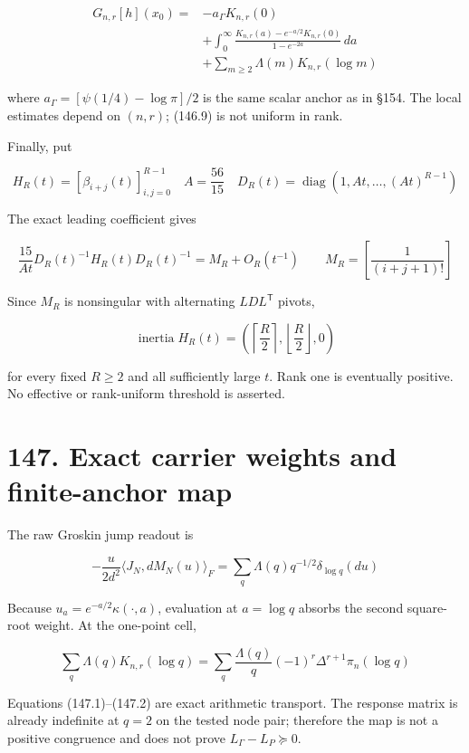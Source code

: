 \documentclass[
  11pt,
]{book}
\begin{document}
\[
\boxed{
\begin{aligned}
G_{n,r}[h](x_0)={}&-a_\Gamma K_{n,r}(0)\\
&+\int_0^\infty
\frac{K_{n,r}(a)-e^{-a/2}K_{n,r}(0)}
{1-e^{-2a}}\,da\\
&+\sum_{m\ge2}\Lambda(m)K_{n,r}(\log m)
\end{aligned}}
\tag{146.9}
\]

where \(a_\Gamma=[\psi(1/4)-\log\pi]/2\) is the same scalar anchor as in
§154. The local estimates depend on \((n,r)\); (146.9) is not uniform in
rank.

Finally, put

\[
H_R(t)=[\beta_{i+j}(t)]_{i,j=0}^{R-1}
\quad
A=\frac{56}{15}
\quad
D_R(t)=\operatorname{diag}
(1,At,\ldots,(At)^{R-1})
\]

The exact leading coefficient gives

\[
\boxed{
\frac{15}{At}D_R(t)^{-1}H_R(t)D_R(t)^{-1}
=M_R+O_R(t^{-1})
\qquad
M_R=\left[\frac1{(i+j+1)!}\right]}
\tag{146.10}
\]

Since \(M_R\) is nonsingular with alternating \(LDL^{\mathsf T}\)
pivots,

\[
\boxed{
\operatorname{inertia}H_R(t)
=\left(\left\lceil\frac R2\right\rceil,
\left\lfloor\frac R2\right\rfloor,0\right)}
\tag{146.11}
\]

for every fixed \(R\ge2\) and all sufficiently large \(t\). Rank one is
eventually positive. No effective or rank-uniform threshold is asserted.

\section{147. Exact carrier weights and finite-anchor
map}\label{exact-carrier-weights-and-finite-anchor-map}

The raw Groskin jump readout is

\[
\boxed{
-\frac{u}{2d^2}\langle J_N,dM_N(u)\rangle_F
=\sum_q\Lambda(q)q^{-1/2}
\delta_{\log q}(du)}
\tag{147.1}
\]

Because \(u_a=e^{-a/2}\kappa(\cdot,a)\), evaluation at \(a=\log q\)
absorbs the second square-root weight. At the one-point cell,

\[
\boxed{
\sum_q\Lambda(q)K_{n,r}(\log q)
=\sum_q\frac{\Lambda(q)}q
(-1)^r\Delta^{r+1}\pi_n(\log q)}
\tag{147.2}
\]

Equations (147.1)--(147.2) are exact arithmetic transport. The response
matrix is already indefinite at \(q=2\) on the tested node pair;
therefore the map is not a positive congruence and does not prove
\(L_\Gamma-L_P\succeq0\).
\end{document}
